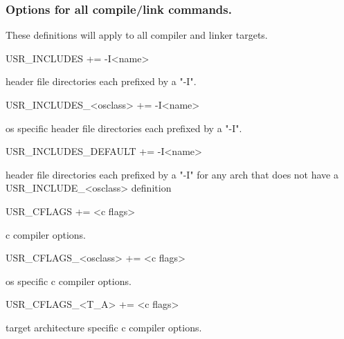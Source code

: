 \subsubsection{Options for all compile/link commands.}

These definitions will apply to all compiler and linker targets.

\begin{description}\item {}USR\_INCLUDES += -I\textless{}name\textgreater{}

\end{description}header file directories each prefixed by a "-I".

\begin{description}\item USR\_INCLUDES\_\textless{}osclass\textgreater{} += -I\textless{}name\textgreater{}

\end{description}os specific header file directories each prefixed by a "-I".

\begin{description}\item USR\_INCLUDES\_DEFAULT += -I\textless{}name\textgreater{}

\end{description}header file directories each prefixed by a "-I" for any arch that does not have a USR\_INCLUDE\_\textless{}osclass\textgreater{} 
definition

\begin{description}\item {}USR\_CFLAGS += \textless{}c flags\textgreater{}

\end{description}c compiler options.

\begin{description}\item USR\_CFLAGS\_\textless{}osclass\textgreater{} += \textless{}c flags\textgreater{}

\end{description}os specific c compiler options.

\begin{description}\item USR\_CFLAGS\_\textless{}T\_A\textgreater{} += \textless{}c flags\textgreater{}

\end{description}target architecture specific c compiler options.

